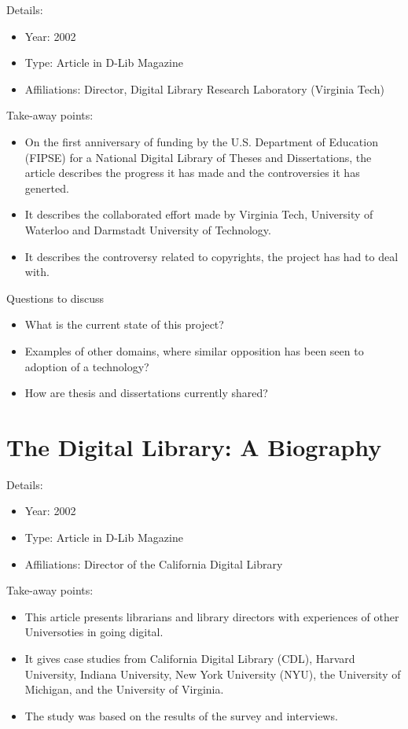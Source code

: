 \documentclass[12pt, onecolumn]{IEEEtran}
\begin{document}
\noindent Details:
\begin{itemize}
  \item Year: 2002
  \item Type: Article in D-Lib Magazine
  \item Affiliations:  Director, Digital Library Research Laboratory (Virginia
  Tech)
\end{itemize}
\medskip
Take-away points:
\begin{itemize}
  \item On the first anniversary of funding by the U.S. Department of Education
  (FIPSE) for a National Digital Library of Theses and Dissertations, the
  article describes the progress it has made and the controversies it has
  generted.
  \item It describes the collaborated effort made by Virginia Tech, University
  of Waterloo and Darmstadt University of Technology.
  \item It describes the controversy related to copyrights, the project  has had
  to deal with.
\end{itemize}
	
\noindent Questions to discuss
\begin{itemize}
  \item What is the current state of this project?
  \item Examples of other domains, where similar opposition has been seen to
  adoption of a technology?
  \item How are thesis and dissertations currently shared?
\end{itemize}
\bigskip\bigskip


\section{The Digital Library: A Biography
\cite{greenstien:02:biography}}

\noindent Details:
\begin{itemize}
  \item Year: 2002
  \item Type: Article in D-Lib Magazine
  \item Affiliations:  Director of the California Digital Library 
\end{itemize}
\medskip
Take-away points:
\begin{itemize}
  \item This article presents librarians and library directors with experiences
  of other Universoties in going digital.
  \item It gives case studies from California Digital Library (CDL), Harvard
  University, Indiana University, New York University (NYU), the University of
  Michigan, and the University of Virginia.
  \item The study was based on the results of the survey and interviews.
\end{itemize}
	
\end{document}
